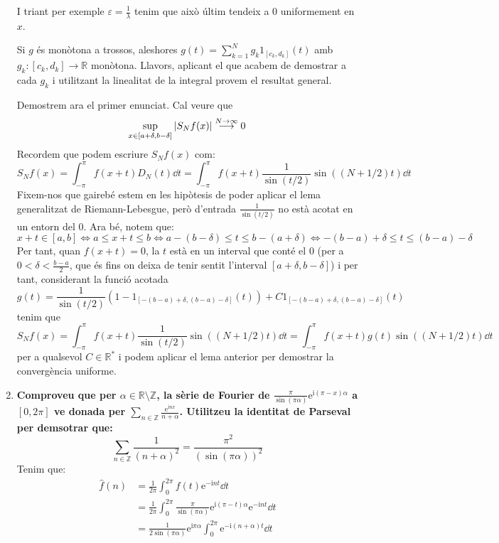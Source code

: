 \documentclass[10pt,a4paper]{article}
\newcommand{\ZZ}{\ensuremath{\mathbb{Z}}} %
\newcommand{\RR}{\ensuremath{\mathbb{R}}} %
\newcommand{\vf}[1]{\boldsymbol{\mathrm{#1}}} %
\newcommand{\ii}{\mathrm{i}} %
\theoremstyle{definition}
\renewcommand{\exp}[1]{\mathrm{e}^{#1}} %
\begin{document}
\begin{enumerate}
        I triant per exemple $\varepsilon=\frac{1}{\lambda}$ tenim que això últim tendeix a 0 uniformement en $x$.

        Si $g$ és monòtona a trossos, aleshores $g(t)=\sum_{k=1}^Ng_k\vf{1}_{[c_k,d_k]}(t)$ amb $g_k:[c_k,d_k]\rightarrow\RR$ monòtona. Llavors, aplicant el que acabem de demostrar a cada $g_k$ i utilitzant la linealitat de la integral provem el resultat general.

        Demostrem ara el primer enunciat. Cal veure que $$\sup_{x\in[a+\delta,b-\delta]}\abs{S_Nf(x)}\overset{N\to\infty}{\longrightarrow}0$$
        Recordem que podem escriure $S_Nf(x)$ com:
        $$S_Nf(x)=\int_{-\pi}^\pi f(x+t)D_N(t)\dd{t}=\int_{-\pi}^\pi f(x+t)\frac{1}{\sin(t/2)}\sin((N+1/2)t)\dd{t}$$
        Fixem-nos que gairebé estem en les hipòtesis de poder aplicar el lema generalitzat de Riemann-Lebesgue, però d'entrada $\frac{1}{\sin(t/2)}$ no està acotat en un entorn del 0. Ara bé, notem que:
        $$x+t\in [a,b]\iff a\leq x+t\leq b\iff a-(b-\delta)\leq t\leq b-(a+\delta)\iff -(b-a)+\delta\leq t\leq(b-a)-\delta$$
        Per tant, quan $f(x+t)=0$, la $t$ està en un interval que conté el 0 (per a $0<\delta<\frac{b-a}{2}$, que és fins on deixa de tenir sentit l'interval $[a+\delta,b-\delta]$) i per tant, considerant la funció acotada $$g(t)=\frac{1}{\sin(t/2)}(1-\vf{1}_{[-(b-a)+\delta,(b-a)-\delta]}(t))+C\vf{1}_{[-(b-a)+\delta,(b-a)-\delta]}(t)$$
        tenim que
        $$S_Nf(x)=\int_{-\pi}^\pi f(x+t)\frac{1}{\sin(t/2)}\sin((N+1/2)t)\dd{t}=\int_{-\pi}^\pi f(x+t)g(t)\sin((N+1/2)t)\dd{t}$$
        per a qualsevol $C\in\RR^*$ i podem aplicar el lema anterior per demostrar la convergència uniforme.
  \item \textbf{Comproveu que per $\alpha\in\RR\setminus\ZZ$, la sèrie de Fourier de $\displaystyle\frac{\pi}{\sin(\pi\alpha)}\exp{\ii(\pi-x)\alpha}$ a $[0,2\pi]$ ve donada per $\sum_{n\in\ZZ}\frac{\exp{\ii nx}}{n+\alpha}$. Utilitzeu la identitat de Parseval per demsotrar que:}
        $$\sum_{n\in\ZZ}\frac{1}{{(n+\alpha)}^2}=\frac{\pi^2}{{(\sin(\pi\alpha))}^2}$$
        Tenim que:
        \begin{align*}
          \widehat{f}(n) & =\frac{1}{2\pi}\int_{0}^{2\pi}f(t)\exp{-\ii n t}\dd{t}                                               \\
                         & =\frac{1}{2\pi}\int_{0}^{2\pi}\frac{\pi}{\sin(\pi\alpha)}\exp{\ii (\pi-t)\alpha}\exp{-\ii n t}\dd{t} \\
                         & =\frac{1}{2\sin(\pi\alpha)}\exp{\ii\pi\alpha}\int_{0}^{2\pi}\exp{-\ii (n+\alpha) t}\dd{t}            \\

\end{align*}
\end{enumerate}
\end{document}
